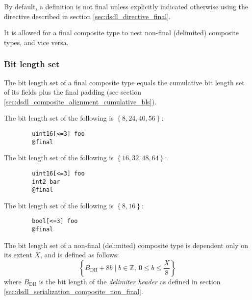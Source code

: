 By default, a definition is not final unless explicitly indicated otherwise using the directive described in
section \ref{sec:dsdl_directive_final}.

It is allowed for a final composite type to nest non-final (delimited) composite types, and vice versa.

\subsubsection{Bit length set}

The bit length set of a final composite type equals the cumulative bit length set
of its fields plus the final padding (see section \ref{sec:dsdl_composite_alignment_cumulative_bls}).

\begin{remark}
    The bit length set of the following is $\left\{ 8, 24, 40, 56 \right\}$:
    \begin{verbatim}
        uint16[<=3] foo
        @final
    \end{verbatim}

    The bit length set of the following is $\left\{ 16, 32, 48, 64 \right\}$:
    \begin{verbatim}
        uint16[<=3] foo
        int2 bar
        @final
    \end{verbatim}

    The bit length set of the following is $\left\{ 8, 16 \right\}$:
    \begin{verbatim}
        bool[<=3] foo
        @final
    \end{verbatim}
\end{remark}

The bit length set of a non-final (delimited) composite type is dependent only on its extent $X$,
and is defined as follows:
$$
    \left\{ B_\text{DH} + 8b \mid b \in \mathbb{Z},\ 0 \leq b \leq \frac{X}{8} \right\}
$$
where $B_\text{DH}$ is the bit length of the \emph{delimiter header}
as defined in section \ref{sec:dsdl_serialization_composite_non_final}.

